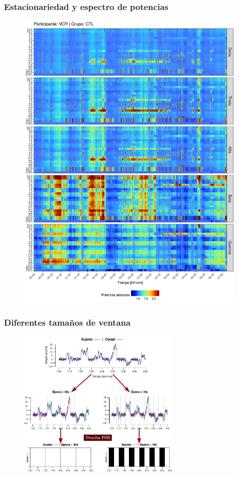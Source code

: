 \documentclass[serif,mathserif,professionalfont]{beamer}
\begin{document}
\begin{frame}\frametitle{Estacionariedad y espectro de potencias}
\begin{figure}
\centering
\includegraphics[width=0.55\linewidth]
{./img_art_dfa/VCNNS1_espectral_total.png}
\end{figure}
\end{frame}


\begin{frame}\frametitle{Diferentes tamaños de ventana}
\begin{figure}
\includegraphics[width=0.7\textwidth]
{./img_diagramas/epocas_diferentes_v2.pdf}
\end{figure}
\end{frame}
\end{document}
